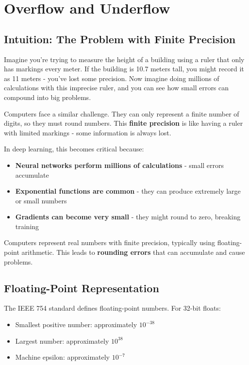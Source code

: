 
\section{Overflow and Underflow }
\label{sec:overflow-underflow}

\subsection{Intuition: The Problem with Finite Precision}

Imagine you're trying to measure the height of a building using a ruler that only has markings every meter. If the building is 10.7 meters tall, you might record it as 11 meters - you've lost some precision. Now imagine doing millions of calculations with this imprecise ruler, and you can see how small errors can compound into big problems.

Computers face a similar challenge. They can only represent a finite number of digits, so they must round numbers. This \textbf{finite precision} is like having a ruler with limited markings - some information is always lost.

In deep learning, this becomes critical because:
\begin{itemize}
    \item \textbf{Neural networks perform millions of calculations} - small errors accumulate
    \item \textbf{Exponential functions are common} - they can produce extremely large or small numbers
    \item \textbf{Gradients can become very small} - they might round to zero, breaking training
\end{itemize}

Computers represent real numbers with finite precision, typically using floating-point arithmetic. This leads to \textbf{rounding errors} that can accumulate and cause problems.

\subsection{Floating-Point Representation}

The IEEE 754 standard defines floating-point numbers. For 32-bit floats:
\begin{itemize}
    \item Smallest positive number: approximately $10^{-38}$
    \item Largest number: approximately $10^{38}$
    \item Machine epsilon: approximately $10^{-7}$
\end{itemize}

